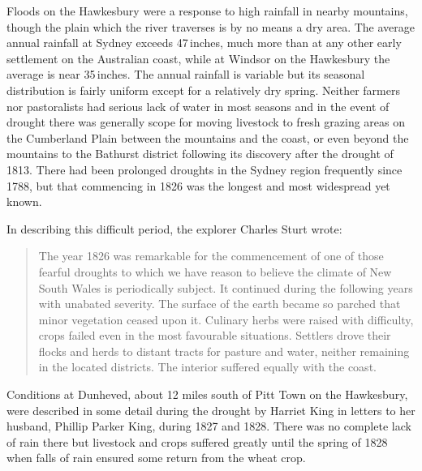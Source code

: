 Floods on the Hawkesbury were a response to high rainfall in nearby
mountains, though the plain which the river traverses is by no means a
dry area.  The average annual rainfall at Sydney exceeds 47\,inches,
much more than at any other early settlement on the Australian coast,
while at Windsor  on the Hawkesbury the average is
near 35\,inches. The annual rainfall is variable but its seasonal
distribution is fairly uniform except for a relatively dry spring.
Neither farmers nor pastoralists had serious lack of water in most
seasons and in the event of drought there was generally scope for
moving livestock to fresh grazing areas on the Cumberland Plain
between the mountains and the coast, or even beyond the mountains to
the Bathurst district following its discovery after the drought of
1813.  There had been prolonged droughts in the Sydney region
frequently since 1788, but that commencing in 1826 was the longest and
most widespread yet known.

In describing this difficult period, the explorer Charles Sturt
 wrote:
\begin{quote}
	The year 1826 was remarkable for the commencement of one of
	those fearful droughts to which we have reason to believe the
	climate of New South Wales is periodically subject.  It
	continued during the following years with unabated severity.
	The surface of the earth became so parched that minor
	vegetation ceased upon it.  Culinary herbs were raised with
	difficulty, crops failed even in the most favourable
	situations.  Settlers drove their flocks and herds to distant
	tracts for pasture and water, neither remaining in the located
	districts.  The interior suffered equally with the
	coast.\fn{\citet{sturt1833}.}
\end{quote}

Conditions at Dunheved, about 12 miles south of
Pitt Town on the Hawkesbury, were described in
some detail during the drought by Harriet King \index{King, H.} in
letters to her husband, Phillip Parker King, \index{King, P.\,K.}
during 1827 and 1828. There was no complete lack of rain there but
livestock and crops suffered greatly until the spring of 1828 when
falls of rain ensured some return from the wheat
crop.\fn{\citet{walsh1967}.}

